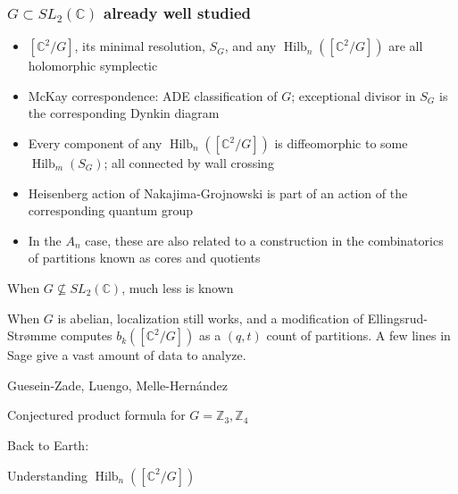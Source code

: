 \documentclass{beamer}
\DeclareMathOperator{\Hilb}{Hilb}
\newcommand{\C}{\mathbb{C}}
\newcommand{\Z}{\mathbb{Z}}
\begin{document}
\begin{frame}
  \frametitle{$G\subset SL_2(\C)$ already well studied}

\begin{itemize}
\item $[\C^2/G]$, its minimal resolution, $S_G$, and any
  $\Hilb_n([\C^2/G])$ are all holomorphic
symplectic
\item McKay correspondence: ADE classification of $G$; exceptional
  divisor in $S_G$ is the corresponding Dynkin diagram 
\item Every component of any $\Hilb_n([\C^2/G])$ is diffeomorphic to
  some $\Hilb_m(S_G)$; all connected by wall crossing
\item Heisenberg action of Nakajima-Grojnowski is part of an action of
  the corresponding quantum group   
\item  In the $A_n$ case, these are also related to a construction in the
combinatorics of partitions known as cores and quotients
\end{itemize}

\end{frame}

\begin{frame}{When $G\nsubseteq SL_2(\C)$, much less is known}


When $G$ is abelian, localization still works, and a modification of
Ellingsrud-Str\o mme computes $b_k([\C^2/G])$ as a $(q,t)$ count of partitions.  A few lines in Sage give a vast amount of data to analyze.


\begin{block}{Guesein-Zade, Luengo, Melle-Hern\'andez} 



Conjectured product formula for $G=\Z_3, \Z_4$ 
\end{block}


\end{frame}


\begin{frame}[plain, c]

\begin{center}

\Huge

Back to Earth:
 \end{center}

\begin{center}
\Huge
Understanding $\Hilb_n([\C^2/G])$
\end{center}

\end{frame}
\end{document}
